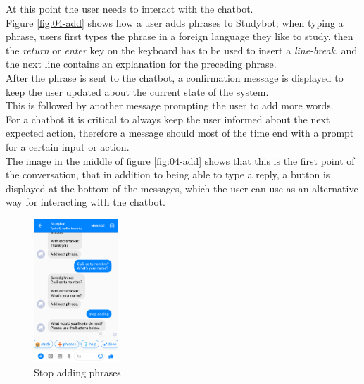 At this point the user needs to interact with the chatbot.
\\
Figure \ref{fig:04-add} shows how a user adds phrases to Studybot;
when typing a phrase, users first types the phrase in a foreign language they like to study,
then the \emph{return} or \emph{enter} key on the keyboard has to be used to insert a \emph{line-break},
and the next line contains an explanation for the preceding phrase.
\\
After the phrase is sent to the chatbot,
a confirmation message is displayed to keep the user updated about the current state of the system.
\\
This is followed by another message prompting the user to add more words.
\\
For a chatbot it is critical to always keep the user informed about the next expected action,
therefore a message should most of the time end with a prompt for a certain input or action.
\\

The image in the middle of figure \ref{fig:04-add} shows that this is the first point of the conversation,
that in addition to being able to type a reply, a button is displayed at the bottom of the messages,
which the user can use as an alternative way for interacting with the chatbot.
\\

\begin{figure}
  \centering
  \includegraphics[width=0.28\textwidth]{images/interface/05-stop-adding.png}
	\caption{Stop adding phrases}
	\label{fig:05-stop-adding}
\end{figure}

